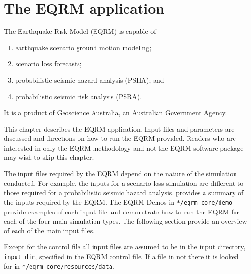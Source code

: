 \chapter{The EQRM application}
\label{ch:application}

The Earthquake Risk Model (EQRM) is capable of:
\begin{enumerate}
\item earthquake scenario ground motion modeling; 
\item scenario loss forecasts; 
\item probabilistic seismic hazard analysis (PSHA); and
\item  probabilistic seismic risk analysis (PSRA).
\end{enumerate}
It is a product of
Geoscience Australia, an Australian Government Agency.

This chapter describes the EQRM application. Input files and
parameters are discussed and directions on how to run the EQRM
provided. Readers who are interested in only the EQRM methodology
and not the EQRM software package may wish to skip this chapter.


The input files required by the EQRM depend on the nature of the
simulation conducted. For example, the inputs for a scenario loss
simulation are different to those required for a probabilistic
seismic hazard analysis.  provides a
summary of the inputs required by the EQRM. The EQRM Demos in
\texttt{*/eqrm\_core/demo} provide examples of each input file and
demonstrate how to run the EQRM for each of the four main simulation
types. The following section provide an overview of each of the main
input files.

Except for the control file all input files are assumed to be in the
input directory, \texttt{input\_dir}, specified in the EQRM control
file.  If a file in not there it is looked for in
\texttt{*/eqrm\_core/resources/data}.

